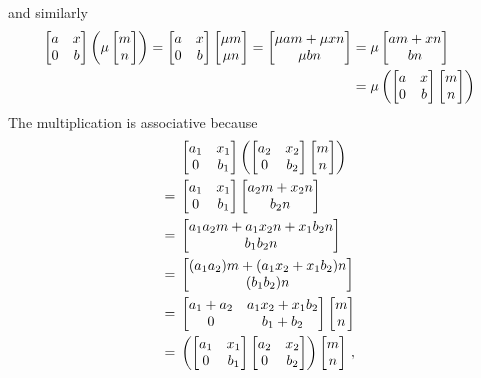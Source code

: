 and similarly
\begin{align*}
  \begin{bmatrix}
    a & x \\
    0 & b
  \end{bmatrix}
  \left(
    \mu
    \begin{bmatrix} m \\ n \end{bmatrix}
  \right)
  =
  \begin{bmatrix}
    a & x \\
    0 & b
  \end{bmatrix}
  \begin{bmatrix} \mu m \\ \mu n \end{bmatrix}
  =
  \begin{bmatrix}  \mu am + \mu xn \\ \mu bn  \end{bmatrix}
  &=
  \mu 
  \begin{bmatrix} am + xn \\ bn \end{bmatrix}
  \\
  &=
  \mu
  \left(
    \begin{bmatrix}
      a & x \\
      0 & b
    \end{bmatrix}
    \begin{bmatrix} m \\ n \end{bmatrix}
  \right)
\end{align*}
The multiplication is associative because
\begin{align*}
  {}&
  \begin{bmatrix}
    a_1 & x_1 \\
    0   & b_1
  \end{bmatrix}
  \left(
    \begin{bmatrix}
      a_2 & x_2 \\
      0   & b_2
    \end{bmatrix}
    \begin{bmatrix} m \\ n \end{bmatrix}
  \right)
  \\
  ={}&
  \begin{bmatrix}
    a_1 & x_1 \\
    0   & b_1
  \end{bmatrix}
  \begin{bmatrix}  a_2 m + x_2 n \\ b_2 n  \end{bmatrix}
  \\
  ={}&
  \begin{bmatrix}  a_1 a_2 m + a_1 x_2 n + x_1 b_2 n \\ b_1 b_2 n  \end{bmatrix}
  \\
  ={}&
  \begin{bmatrix}  (a_1 a_2) m + (a_1 x_2 + x_1 b_2) n \\ (b_1 b_2) n  \end{bmatrix}
  \\
  ={}&
  \begin{bmatrix}
    a_1 + a_2 & a_1 x_2 + x_1 b_2 \\
    0         & b_1 + b_2
  \end{bmatrix}
  \begin{bmatrix} m \\ n \end{bmatrix}
  \\
  ={}&
  \left(
    \begin{bmatrix}
      a_1 & x_1 \\
      0   & b_1
    \end{bmatrix}
    \begin{bmatrix}
      a_2 & x_2 \\
      0   & b_2
    \end{bmatrix}
  \right)
  \begin{bmatrix} m \\ n \end{bmatrix} \,,
\end{align*}
